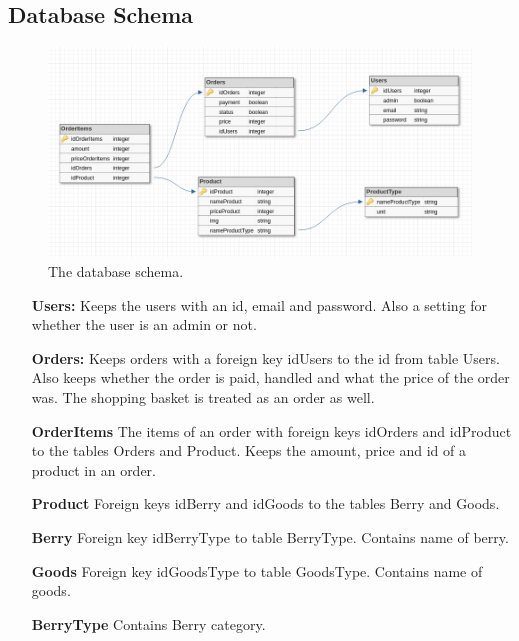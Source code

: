 \newpage

\subsection{Database Schema}

\begin{figure}[H]
  \centering
  \includegraphics[width=\textwidth]{second_sprint/db_schema.png}
  \caption{\label{fig:schema} The database schema.}
\end{figure}

\begin{itemize}
  \item[\textbf{Users:}] Keeps the users with an id, email and password. Also a
    setting for whether the user is an admin or not.
  \item[\textbf{Orders:}] Keeps orders with a foreign key idUsers to the
    id from table Users. Also keeps whether the order is paid, handled and
    what the price of the order was. The shopping basket is treated as an
    order as well.
  \item[\textbf{OrderItems}] The items of an order with foreign keys
    idOrders and idProduct to the tables Orders and Product.  Keeps the
    amount, price and id of a product in an order.
  \item[\textbf{Product}] Foreign keys idBerry and idGoods to the tables
    Berry and Goods.
  \item[\textbf{Berry}] Foreign key idBerryType to table BerryType. Contains
    name of berry.
  \item[\textbf{Goods}] Foreign key idGoodsType to table GoodsType. Contains
    name of goods.
  \item[\textbf{BerryType}] Contains Berry category.
\end{itemize}
